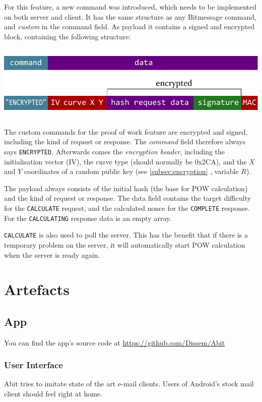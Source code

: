 \documentclass{bfh}
\begin{document}
  For this feature, a new command was introduced, which needs to be implemented on both server and client. It has the same structure as any Bitmessage command, and \textit{custom} in the command field. As payload it contains a signed and encrypted block, containing the following structure:

  \includegraphics[width=\textwidth]{images/custom_message.pdf}

  The custom commands for the proof of work feature are encrypted and signed, including the kind of request or response. The \textit{command} field therefore always says \texttt{ENCRYPTED}. Afterwards comes the \textit{encryption header}, including the initialisation vector (IV), the curve type (should normally be 0x2CA), and the $X$ and $Y$ coordinates of a random public key (see \ref{subsec:encryption} , variable $R$).

  The payload always consists of the initial hash (the base for \ac{POW} calculation) and the kind of request or response. The data field contains the target difficulty for the \texttt{CALCULATE} request, and the calculated nonce for the \texttt{COMPLETE} response. For the \texttt{CALCULATING} response data is an empty array.

  \texttt{CALCULATE} is also used to poll the server. This has the benefit that if there is a temporary problem on the server, it will automatically start \ac{POW} calculation when the server is ready again.


  \newpage
  \section{Artefacts}

  \subsection{App}
  You can find the app's source code at \url{https://github.com/Dissem/Abit}

  \subsubsection{User Interface}
  Abit tries to imitate state of the art e-mail clients. Users of Android's stock mail client should feel right at home.
\end{document}
